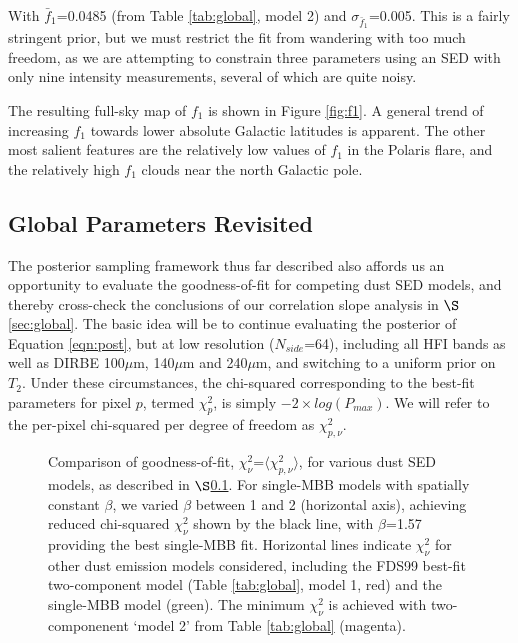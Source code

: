 \documentclass{emulateapj}
\begin{document}
With $\bar{f}_1$=0.0485 (from Table \ref{tab:global}, model 2) and 
$\sigma_{\bar{f}_1}$=0.005. This is a fairly stringent prior, but we must 
restrict the fit from wandering with too much freedom, as we are attempting to 
constrain three parameters using an SED with only nine intensity measurements, 
several of which are quite noisy.

The resulting full-sky map of $f_1$ is shown in Figure \ref{fig:f1}. A 
general trend of increasing $f_1$ towards lower absolute Galactic latitudes is 
apparent. The other most salient features are the relatively low
values of $f_1$ in the Polaris flare, and the relatively high $f_1$ clouds
near the north Galactic pole.

\subsection{Global Parameters Revisited}
\label{sec:hier}

The posterior sampling framework thus far described also affords us an
opportunity to evaluate the goodness-of-fit for competing dust SED models, and 
thereby cross-check the conclusions of our correlation slope analysis in
$\S$\ref{sec:global}. The basic idea will be to continue evaluating the 
posterior of Equation \ref{eqn:post}, but at low resolution ($N_{side}$=64), 
including all HFI bands as well as DIRBE 100$\mu$m, 140$\mu$m and 240$\mu$m, 
and switching to a uniform prior on $T_2$. Under these circumstances, the 
chi-squared corresponding to the best-fit parameters for pixel $p$, termed 
$\chi^2_p$, is simply $-2 \times log(P_{max})$. We will refer to the
per-pixel chi-squared per degree of freedom as $\chi^2_{p, \nu}$.

\begin{figure}
\begin{center}
\caption{\label{fig:chi2_dirbe} Comparison of goodness-of-fit, 
$\chi^2_{\nu}$=$\langle \chi^2_{p, \nu} \rangle$, for various dust SED models,
as described in $\S$\ref{sec:hier}. For single-MBB models with spatially 
constant $\beta$, we varied $\beta$ between 1 and 2 (horizontal axis), 
achieving reduced chi-squared $\chi^2_{\nu}$ shown by the black line, with 
$\beta$=1.57 providing the best single-MBB fit. Horizontal lines indicate 
$\chi^2_{\nu}$ for other dust emission models considered, including the FDS99 
best-fit two-component model (Table \ref{tab:global}, model 1, red) and the 
\cite{planckdust} single-MBB model (green). The minimum $\chi^2_{\nu}$ is 
achieved with two-componenent `model 2' from Table \ref{tab:global} (magenta).}
\end{center}
\end{figure}
\end{document}
